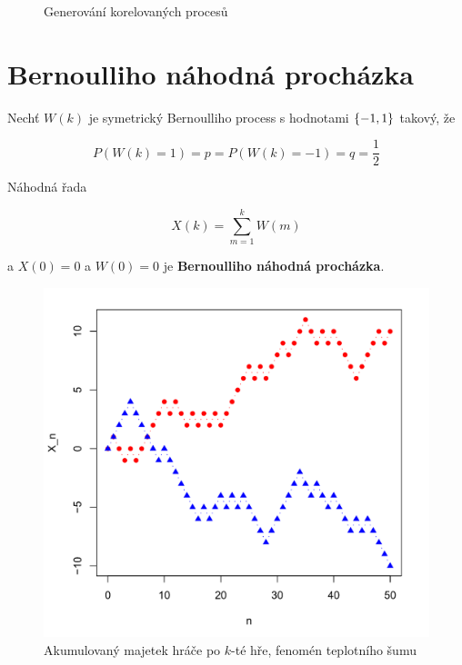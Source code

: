 \begin{figure}
\caption{Generování korelovaných procesů}
\end{figure}

\section{Bernoulliho náhodná procházka}
Nechť $W(k)$ je symetrický Bernoulliho process s hodnotami $\left\{-1,1\right\}$ takový, že

\[ P(W(k)=1) = p = P(W(k)=-1)=q=\frac{1}{2} \]

Náhodná řada

\[ X(k) = \sum_{m=1}^k W(m) \]

a $X(0)=0$ a $W(0)=0$ je \textbf{Bernoulliho náhodná procházka}.

\begin{figure}
	\includegraphics[scale=0.3]{obrazky/random_walk.png}
\caption{Akumulovaný majetek hráče po $k$-té hře, fenomén teplotního šumu}
\end{figure}

